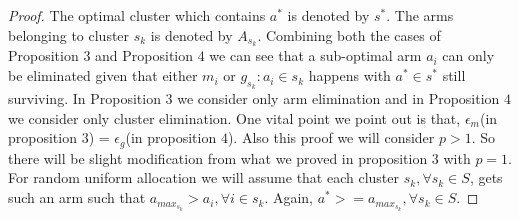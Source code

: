 \begin{proof}
The optimal cluster which contains $a^{*}$ is denoted by $s^{*}$. The arms belonging to cluster $s_{k}$ is denoted by $A_{s_{k}}$. Combining both the cases of Proposition $3$ and Proposition $4$ we can see that a sub-optimal arm $a_{i}$ can only be eliminated given that either $m_{i}$ or $g_{s_{k}}:a_{i}\in s_{k}$ happens with $a^{*}\in s^{*}$ still surviving. In Proposition $3$ we consider only arm elimination and in Proposition $4$ we consider only cluster elimination. One vital point we point out is that, $\epsilon_{m}$(in proposition $3$) = $\epsilon_{g}$(in proposition $4$). Also this proof we will consider $p>1$. So there will be slight modification from what we proved in proposition $3$ with $p=1$. For random uniform allocation we will assume that each cluster $s_{k},\forall s_{k}\in S$, gets such an arm such that $a_{max_{s_{k}}}> a_{i},\forall i\in s_{k}$. Again, $a^{*}>=a_{max_{s_{k}}}, \forall s_{k}\in S$.

\end{proof}
